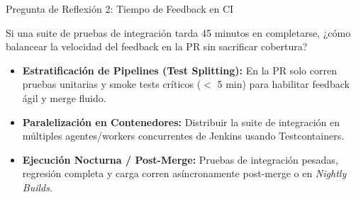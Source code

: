 \documentclass[aspectratio=169]{beamer}
\begin{document}
\begin{frame}{Pregunta de Reflexión 2: Tiempo de Feedback en CI}
  \begin{tcolorbox}[colback=cbBlue!8,colframe=cbBlue,arc=4pt,title=\textbf{Pregunta 2: El Dilema del Tiempo en Pipelines de CI},coltitle=cbWhite,fonttitle=\bfseries\small,top=4pt,bottom=4pt,left=6pt,right=6pt]
    \small Si una suite de pruebas de integración tarda 45 minutos en completarse, ¿cómo balancear la velocidad del feedback en la PR sin sacrificar cobertura?
  \end{tcolorbox}
  \vspace{0.2cm}
  \pause
  \begin{tcolorbox}[colback=cbGreen!10,colframe=cbGreen,arc=4pt,title=\textbf{Análisis y Respuesta de Ingeniería},coltitle=cbWhite,fonttitle=\bfseries\small,top=4pt,bottom=4pt,left=6pt,right=6pt]
    \footnotesize
    \begin{itemize}
      \setlength{\itemsep}{1.5pt}
      \item \textbf{Estratificación de Pipelines (Test Splitting):} En la PR solo corren pruebas unitarias y smoke tests críticos ($<$ 5 min) para habilitar feedback ágil y merge fluido.
      \item \textbf{Paralelización en Contenedores:} Distribuir la suite de integración en múltiples agentes/workers concurrentes de Jenkins usando Testcontainers.
      \item \textbf{Ejecución Nocturna / Post-Merge:} Pruebas de integración pesadas, regresión completa y carga corren asíncronamente post-merge o en \textit{Nightly Builds}.
    \end{itemize}
  \end{tcolorbox}
\end{frame}
\end{document}
